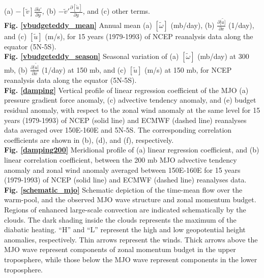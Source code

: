 \documentclass[12pt]{article}
\begin{document}
(a) $- [\widetilde{v}] \frac{\partial \widetilde{u}'}{\partial y}$, 
(b) $- \widetilde{v}' \frac{\partial [\widetilde{u}]}{\partial y}$, and
(c) other terms.
\\
{\bf Fig. \ref{vbudgeteddy_mean}}
Annual mean 
(a) $[\widetilde{\omega}]$ (mb/day), 
(b) $\frac{\partial [\widetilde{u]}}{\partial x}$ (1/day),  
and 
(c) $[\widetilde{u}]$ (m/s), 
for 15 years (1979-1993) of NCEP
reanalysis data along the equator (5N-5S).
\\
{\bf Fig. \ref{vbudgeteddy_season}}
Seasonal variation of 
(a) $[\widetilde{\omega}]$ (mb/day) at 300 mb, 
(b) $\frac{\partial [\widetilde{u]}}{\partial x}$ (1/day) at 150 mb,  
and 
(c) $[\widetilde{u}]$ (m/s) at 150 mb, 
for NCEP
reanalysis data along the equator (5N-5S).
\\
{\bf Fig. \ref{damping}}
Vertical profile of linear regression coefficient of the MJO
(a) pressure gradient force anomaly, 
(c) advective tendency anomaly, and
(e) budget residual anomaly,
with respect to the zonal wind anomaly at the same level 
for 15 years (1979-1993) of NCEP (solid line) and ECMWF (dashed line)
reanalyses data averaged over 
150E-160E and 5N-5S.
The corresponding correlation coefficients are shown in (b), (d), and (f),
respectively.
\\
{\bf Fig. \ref{damping200}}
Meridional profile of (a) linear regression coefficient, and
(b) linear correlation coefficient, between the 200 mb MJO
advective tendency anomaly
and zonal wind anomaly 
averaged between 150E-160E
for 15 years (1979-1993) of NCEP (solid line) and ECMWF (dashed line)
reanalyses data.
\\
{\bf Fig. \ref{schematic_mjo}}
Schematic depiction of the time-mean flow over the warm-pool, and the
observed MJO wave structure and 
zonal momentum budget.
Regions of enhanced large-scale convection are indicated schematically
by the clouds. The dark shading inside the clouds represents the maximum of
the diabatic heating.
``H'' and ``L'' represent the high and low geopotential height anomalies,
respectively.
Thin arrows represent the winds.
Thick arrows above the MJO wave represent components of zonal momentum budget
in the upper troposphere, while those below the MJO wave represent
components in the lower troposphere.
\\

\newpage
\pagestyle{empty}



\end{document}
